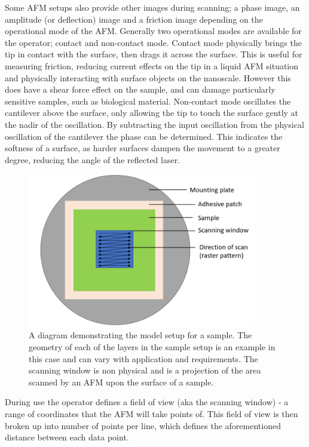 Some AFM setups also provide other images during scanning; a phase image, an amplitude (or deflection) image and a friction image depending on the operational mode of the AFM. Generally two operational modes are available for the operator; contact and non-contact mode. Contact mode physically brings the tip in contact with the surface, then drags it across the surface. This is useful for measuring friction, reducing current effects on the tip in a liquid AFM situation and physically interacting with surface objects on the nanoscale. However this does have a shear force effect on the sample, and can damage particularly sensitive samples, such as biological material. Non-contact mode oscillates the cantilever above the surface, only allowing the tip to touch the surface gently at the nadir of the oscillation. By subtracting the input oscillation from the physical oscillation of the cantilever the phase can be determined. This indicates the softness of a surface, as harder surfaces dampen the movement to a greater degree, reducing the angle of the reflected laser.

\begin{figure}[h!]     %
        \begin{center}
          \includegraphics[width=100mm]{chapter2/SampleExample.PNG}
\end{center}
\caption{A diagram demonstrating the model setup for a sample. The geometry of each of the layers in the sample setup is an example in this case and can vary with application and requirements. The scanning window is non physical and is a projection of the area scanned by an AFM upon the surface of a sample.}
\label{fig:SampleExample}                 %
\end{figure}

During use the operator defines a field of view (aka the scanning window) -  a range of coordinates that the AFM will take points of. This field of view is then broken up into number of points per line, which defines the aforementioned distance between each data point.

